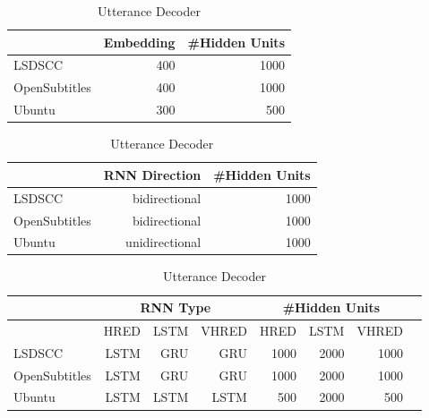 \begin{table}
    \centering
    \caption{Model Configuration}
    \label{tab:model_config}
    \begin{subtable}{0.5\textwidth}
        \centering
        \caption{Utterance Encoder}
        \begin{tabular}{|l|r|r|}
            \hline
            & {Embedding} & {\#Hidden Units} \\
            \hline
            LSDSCC & 400 & 1000 \\
            \hline
            OpenSubtitles & 400 & 1000 \\
            \hline
            Ubuntu & 300 & 500 \\
            \hline
        \end{tabular}
    \end{subtable}%
    \begin{subtable}{0.45\textwidth}
        \centering
        \caption{Context Encoder}
        \begin{tabular}{|l|r|r|}
            \hline
            & RNN Direction & \#Hidden Units \\
            \hline
            LSDSCC & bidirectional & 1000 \\
            \hline
            OpenSubtitles & bidirectional & 1000 \\
            \hline
            Ubuntu & unidirectional & 1000 \\
            \hline
        \end{tabular}
    \end{subtable}
    \begin{subtable}{\textwidth}
        \centering
        \caption{Utterance Decoder}
        \begin{tabular}{|l|*{7}{r|}}
            \hline
            & \multicolumn{3}{c|}{RNN Type}
            & \multicolumn{3}{c|}{\#Hidden Units} \\
            \hline
            & HRED & LSTM & VHRED & HRED & LSTM & VHRED \\
            \hline
            LSDSCC & LSTM & GRU & GRU & 1000 & 2000 & 1000 \\
            \hline
            OpenSubtitles & LSTM & GRU & GRU & 1000 & 2000 & 1000 \\
            \hline
            Ubuntu & LSTM & LSTM & LSTM & 500 & 2000 & 500 \\
            \hline
        \end{tabular}
    \end{subtable}
\end{table}